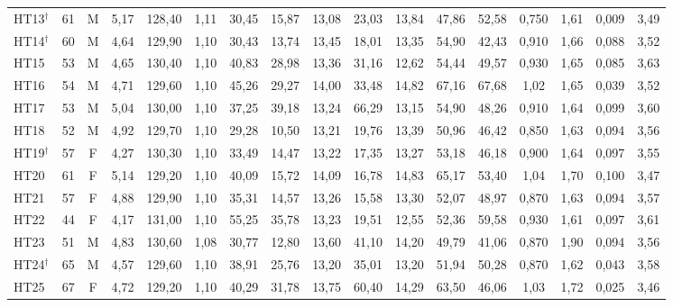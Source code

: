 \begin{table}[H]
{\begin{tabular}{lcccccccccccccccc}
HT13$^\dagger$ & 61 & M & 5,17 & 128,40 & 1,11 & 30,45 & 15,87 & 13,08 & 23,03 & 13,84 & 47,86 & 52,58 & 0,750 & 1,61 & 0,009 & 3,49\\
HT14$^\dagger$ & 60 & M & 4,64 & 129,90 & 1,10 & 30,43 & 13,74 & 13,45 & 18,01 & 13,35 & 54,90 & 42,43 & 0,910 & 1,66 & 0,088 & 3,52\\
HT15 & 53 & M & 4,65 & 130,40 & 1,10 & 40,83 & 28,98 & 13,36 & 31,16 & 12,62 & 54,44 & 49,57 & 0,930 & 1,65 & 0,085 & 3,63\\
HT16 & 54 & M & 4,71 & 129,60 & 1,10 & 45,26 & 29,27 & 14,00 & 33,48 & 14,82 & 67,16 & 67,68 & 1,02 & 1,65 & 0,039 & 3,52\\
HT17 & 53 & M & 5,04 & 130,00 & 1,10 & 37,25 & 39,18 & 13,24 & 66,29 & 13,15 & 54,90 & 48,26 & 0,910 & 1,64 & 0,099 & 3,60\\
HT18 & 52 & M & 4,92 & 129,70 & 1,10 & 29,28 & 10,50 & 13,21 & 19,76 & 13,39 & 50,96 & 46,42 & 0,850 & 1,63 & 0,094 & 3,56\\
HT19$^\dagger$ & 57 & F & 4,27 & 130,30 & 1,10 & 33,49 & 14,47 & 13,22 & 17,35 & 13,27 & 53,18 & 46,18 & 0,900 & 1,64 & 0,097 & 3,55\\
HT20 & 61 & F & 5,14 & 129,20 & 1,10 & 40,09 & 15,72 & 14,09 & 16,78 & 14,83 & 65,17 & 53,40 & 1,04 & 1,70 & 0,100 & 3,47\\
HT21 & 57 & F & 4,88 & 129,90 & 1,10 & 35,31 & 14,57 & 13,26 & 15,58 & 13,30 & 52,07 & 48,97 & 0,870 & 1,63 & 0,094 & 3,57\\
HT22 & 44 & F & 4,17 & 131,00 & 1,10 & 55,25 & 35,78 & 13,23 & 19,51 & 12,55 & 52,36 & 59,58 & 0,930 & 1,61 & 0,097 & 3,61\\
HT23 & 51 & M & 4,83 & 130,60 & 1,08 & 30,77 & 12,80 & 13,60 & 41,10 & 14,20 & 49,79 & 41,06 & 0,870 & 1,90 & 0,094 & 3,56\\
HT24$^\dagger$ & 65 & M & 4,57 & 129,60 & 1,10 & 38,91 & 25,76 & 13,20 & 35,01 & 13,20 & 51,94 & 50,28 & 0,870 & 1,62 & 0,043 & 3,58\\
HT25 & 67 & F & 4,72 & 129,20 & 1,10 & 40,29 & 31,78 & 13,75 & 60,40 & 14,29 & 63,50 & 46,06 & 1,03 & 1,72 & 0,025 & 3,46\\
\bottomrule\end{tabular}}
\end{table}
